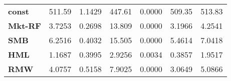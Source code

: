 \begin{center}
\begin{tabular}{lcccccc}
\midrule
\textbf{const}  &       511.59       &       1.1429       &      447.61     &      0.0000      &       509.35      &       513.83       \\
\textbf{Mkt-RF} &       3.7253       &       0.2698       &      13.809     &      0.0000      &       3.1966      &       4.2541       \\
\textbf{SMB}    &       6.2516       &       0.4032       &      15.505     &      0.0000      &       5.4614      &       7.0418       \\
\textbf{HML}    &       1.1687       &       0.3995       &      2.9256     &      0.0034      &       0.3857      &       1.9517       \\
\textbf{RMW}    &       4.0757       &       0.5158       &      7.9025     &      0.0000      &       3.0649      &       5.0866       \\
\bottomrule
\end{tabular}
\end{center}
